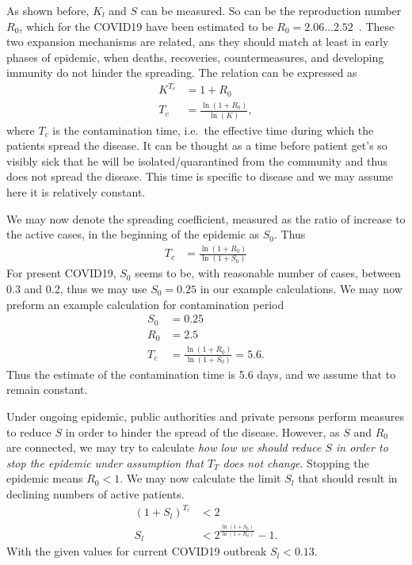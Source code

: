 As shown before, $K_l$ and $S$ can be measured. So can be the reproduction
number $R_0$, which for the COVID19 have been estimated to be $R_0=2.06 \ldots
2.52$~\cite{Zhang_S2020}.
These two expansion mechanisms are related, ans they should match at least in early phases of
epidemic, when deaths, recoveries, countermeasures, and developing immunity do not hinder the
spreading. The relation can be expressed as 
\begin{align}
    K^{T_c}&= 1+R_0\\
    T_c&=\frac{\ln\left(1+R_0\right)}{\ln\left(K\right)},
\end{align}
where $T_c$ is the contamination time, i.e.\ the effective time during which the patients
spread the disease. It can be thought as a time before patient get's so
visibly sick that he will be isolated/quarantined from the community and thus
does not spread the disease. This time is specific to disease and we may
assume here it is relatively constant.

We may now denote the spreading coefficient, measured as the ratio of increase
to the active cases, in the beginning of the epidemic as $S_0$. Thus
\begin{align}
    T_c&=\frac{\ln\left(1+R_0\right)}{\ln\left(1+S_0\right)}
\end{align}
For present COVID19, $S_0$ seems to be, with reasonable number of cases,
between 0.3 and 0.2, thus we may use $S_0=0.25$ in our example
calculations. We may now preform an example calculation for contamination
period 
\begin{align}
    S_0&=0.25\\
    R_0&=2.5\\
    T_c&=\frac{\ln\left(1+R_0\right)}{\ln\left(1+S_0\right)}=5.6.
\end{align}
Thus the estimate of the contamination time is 5.6 days, and we assume that to
remain constant.

Under ongoing epidemic, public authorities and private persons perform
measures to reduce $S$ in order to hinder the spread of the disease. However,
as $S$ and $R_0$ are connected, we may try to calculate \emph{how low we should
reduce $S$ in order to stop the epidemic under assumption that $T_T$ does not
change}. Stopping the epidemic means $R_0< 1$. We may now calculate the limit
$S_l$ that should result in declining numbers of active patients.
\begin{align}
    {\left(1+S_l\right)}^{T_c}&<2\\
    S_l&<2^{\frac{\ln\left(1+S_0\right)}{\ln\left(1+R_0\right)}}-1.
\end{align}
With the given values for current COVID19 outbreak $S_l<0.13$. 

